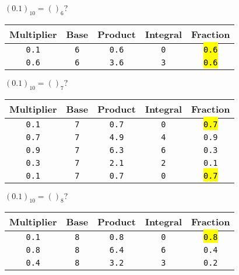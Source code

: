 \documentclass[12pt]{article}
\begin{document}
\begin{minipage}[t]{0.5\textwidth}
	$(0.1)_{10} = ()_6?$
	\begin{center}
		\begin{tabular}{|c|c|c|c|c|}
			\hline \cellcolor{gray!25}Multiplier &
			\cellcolor{gray!25}Base &
			\cellcolor{gray!25}Product &
			\cellcolor{gray!25}Integral &
			\cellcolor{gray!25}Fraction \\
			\hline\hline
			\texttt{0.1} & \texttt{6} & \texttt{0.6} & \texttt{0} & \hl{\texttt{0.6}} \\\hline
			\texttt{0.6} & \texttt{6} & \texttt{3.6} & \texttt{3} & \hl{\texttt{0.6}} \\\hline
		\end{tabular}
	\end{center}
	$(0.1)_{10} = ()_7?$
	\begin{center}
		\begin{tabular}{|c|c|c|c|c|}
			\hline \cellcolor{gray!25}Multiplier &
			\cellcolor{gray!25}Base &
			\cellcolor{gray!25}Product &
			\cellcolor{gray!25}Integral &
			\cellcolor{gray!25}Fraction \\
			\hline\hline
			\texttt{0.1} & \texttt{7} & \texttt{0.7} & \texttt{0} & \hl{\texttt{0.7}} \\\hline
			\texttt{0.7} & \texttt{7} & \texttt{4.9} & \texttt{4} & \texttt{0.9} \\\hline
			\texttt{0.9} & \texttt{7} & \texttt{6.3} & \texttt{6} & \texttt{0.3} \\\hline
			\texttt{0.3} & \texttt{7} & \texttt{2.1} & \texttt{2} & \texttt{0.1} \\\hline
			\texttt{0.1} & \texttt{7} & \texttt{0.7} & \texttt{0} & \hl{\texttt{0.7}} \\\hline
		\end{tabular}
	\end{center}
	$(0.1)_{10} = ()_8?$
	\begin{center}
		\begin{tabular}{|c|c|c|c|c|}
			\hline \cellcolor{gray!25}Multiplier &
			\cellcolor{gray!25}Base &
			\cellcolor{gray!25}Product &
			\cellcolor{gray!25}Integral &
			\cellcolor{gray!25}Fraction \\
			\hline\hline
			\texttt{0.1} & \texttt{8} & \texttt{0.8} & \texttt{0} & \hl{\texttt{0.8}} \\\hline
			\texttt{0.8} & \texttt{8} & \texttt{6.4} & \texttt{6} & \texttt{0.4} \\\hline
			\texttt{0.4} & \texttt{8} & \texttt{3.2} & \texttt{3} & \texttt{0.2} \\\hline

\end{tabular}
\end{center}
\end{minipage}
\end{document}
